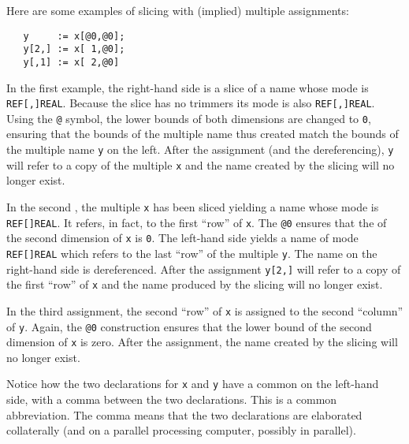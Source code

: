 Here are some examples of slicing with (implied) multiple assignments:
\begin{verbatim}
   y     := x[@0,@0];
   y[2,] := x[ 1,@0];
   y[,1] := x[ 2,@0]
\end{verbatim}
\noindent
In the first example, the right-hand side is a slice of a name whose
mode is \verb|REF[,]REAL|. Because the slice has no trimmers its mode
is also \verb|REF[,]REAL|. Using the \verb|@| symbol, the lower bounds
of both dimensions are changed to \verb|0|, ensuring that the bounds of
the multiple name thus created match the bounds of the multiple name
\verb|y| on the left. After the assignment (and the dereferencing),
\verb|y| will refer to a copy of the multiple \verb|x| and the name
created by the slicing will no longer exist.

In the second , the multiple \verb|x| has
been sliced yielding a name whose mode is \verb|REF[]REAL|.  It refers,
in fact, to the first ``row'' of \verb|x|.  The \verb|@0| ensures that
the  of the second dimension of \verb|x|
is \verb|0|. The left-hand side yields a name of mode \verb|REF[]REAL|
which refers to the last ``row'' of the multiple \verb|y|.  The name on
the right-hand side is dereferenced. After the assignment \verb|y[2,]|
will refer to a copy of the first ``row'' of \verb|x| and the name
produced by the slicing will no longer exist.

In the third assignment, the second ``row'' of \verb|x| is assigned to
the second ``column'' of \verb|y|.  Again, the \verb|@0| construction
ensures that the lower bound of the second dimension of \verb|x| is
zero. After the assignment, the name created by the slicing
will no longer exist.

Notice how the two declarations for \verb|x| and \verb|y| have a common
 on the left-hand side, with a
comma between the two declarations. This is a common abbreviation. The
comma means that the two declarations are elaborated collaterally (and
on a parallel processing computer, possibly in parallel).

